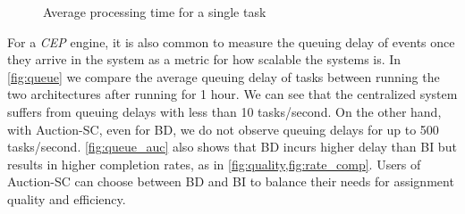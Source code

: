 \begin{figure}[h]
    \centering
       \vspace{-0.15in}
    \caption{Average processing time for a single task}
    \label{fig:runtime}
\end{figure}

For a \emph{CEP} engine, it is also common to measure the queuing delay of events \cite{Wu06} once they arrive in the system as a metric for how scalable the systems is. In \cref{fig:queue} we compare the average queuing delay of tasks between running the two architectures after running for 1 hour. We can see that the centralized system suffers from queuing delays with less than 10 tasks/second. On the other hand, with Auction-SC, even for BD, we do not observe queuing delays for up to 500 tasks/second. \cref{fig:queue_auc} also shows that BD incurs higher delay than BI but results in higher completion rates, as in \cref{fig:quality,fig:rate_comp}. Users of Auction-SC can choose between BD and BI to balance their needs for assignment quality and efficiency.


